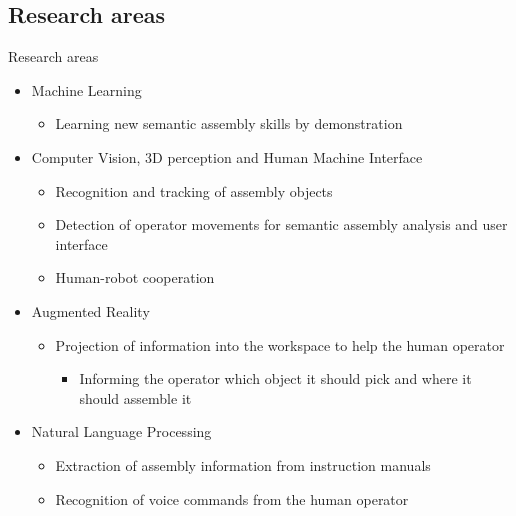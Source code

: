 \subsection{Research areas}
\begin{frame}{Research areas}
	\begin{itemize}
		\item Machine Learning
		\begin{itemize}
			\item Learning new semantic assembly skills by demonstration
		\end{itemize}
		\item Computer Vision, 3D perception and Human Machine Interface
		\begin{itemize}
			\item Recognition and tracking of assembly objects
			\item Detection of operator movements for semantic assembly analysis and user interface
			\item Human-robot cooperation
		\end{itemize}
		\item Augmented Reality
		\begin{itemize}
			\item Projection of information into the workspace to help the human operator
			\begin{itemize}
				\item Informing the operator which object it should pick and where it should assemble it
			\end{itemize}
		\end{itemize}
		\item Natural Language Processing
		\begin{itemize}
			\item Extraction of assembly information from instruction manuals
			\item Recognition of voice commands from the human operator
		\end{itemize}
	\end{itemize}
\end{frame}
